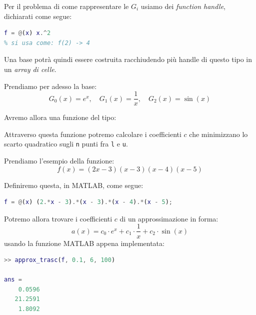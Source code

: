 \documentclass[a4paper,11pt]{article}
\begin{document}
Per il problema di come rappresentare le $G_i$ usiamo dei \textit{function handle}, dichiarati come segue:
\begin{lstlisting}[language=matlab, style=codestyle]	
% un function handle alla funzione f(x) = x^2
f = @(x) x.^2
% si usa come: f(2) -> 4
\end{lstlisting}
Una base potrà quindi essere costruita racchiudendo più handle di questo tipo in un \textit{array di celle}.

Prendiamo per adesso la base:
$$
G_0(x) = e^x, \quad G_1(x) = \frac{1}{x}, \quad G_2(x) = \sin(x)
$$

\par\medskip
\noindent

\begin{minipage}{\textwidth}
Avremo allora una funzione del tipo:

\end{minipage}

\par\medskip

Attraverso questa funzione potremo calcolare i coefficienti $c$ che minimizzano lo scarto quadratico sugli \lstinline|n| punti fra \lstinline|l| e \lstinline|u|.

\par\smallskip

Prendiamo l'esempio della funzione:
$$
f\left(x\right)=\left(2x-3\right)\left(x-3\right)\left(x-4\right)\left(x-5\right)
$$

Definiremo questa, in MATLAB, come segue:
\begin{lstlisting}[language=matlab, style=codestyle]	
f = @(x) (2.*x - 3).*(x - 3).*(x - 4).*(x - 5);
\end{lstlisting}

Potremo allora trovare i coefficienti $c$ di un approssimazione in forma:
$$
a(x) = c_{0}\cdot e^{x}+c_{1}\cdot\frac{1}{x}+c_{2}\cdot\sin\left(x\right)
$$
usando la funzione MATLAB appena implementata:
\begin{lstlisting}[language=matlab, style=codestyle]	
>> approx_trasc(f, 0.1, 6, 100)

ans =
    0.0596
   21.2591
    1.8092
\end{lstlisting}

\par\medskip
\noindent
\end{document}
